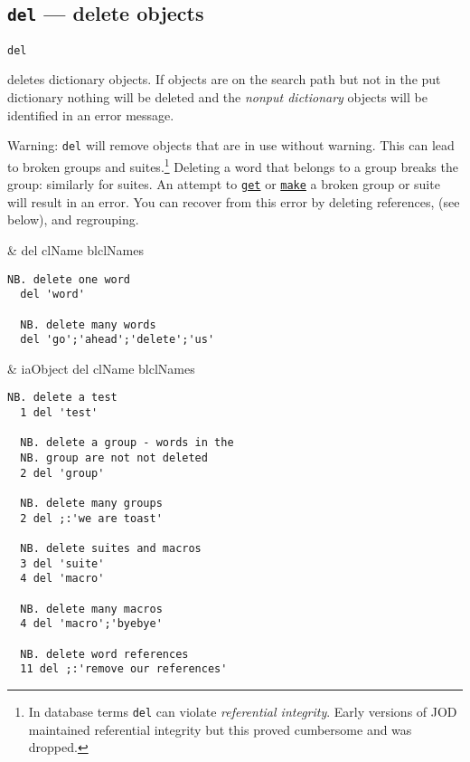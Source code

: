 \subsection{\texttt{del} --- delete objects}

\hypertarget{il:del}{\texttt{del}} deletes dictionary objects. 
If objects are on the search path but not
 in the put dictionary nothing will be deleted and 
 the \emph{nonput dictionary} objects will be identified in an error message. 

Warning: \texttt{del} will remove objects that are in use without warning.
 This can lead to broken groups and suites.\footnote{In database
 terms \texttt{del} can violate \emph{referential integrity}. Early versions
 of JOD maintained referential integrity but this proved cumbersome and
 was dropped.} Deleting a word that belongs
 to a group breaks the group:  similarly for suites.
 An attempt to \hyperlink{il:get}{\texttt{get}} or \hyperlink{il:make}{\texttt{make}}
  a broken group or suite will result in an error.  You can recover from this
  error by deleting references, (see below), and regrouping.
  
\begin{wordhead}
\monad &  del clName \argsep blclNames \\
\end{wordhead}
\begin{lstlisting}[frame=single,framerule=0pt]
  NB. delete one word
  del 'word'  
  
  NB. delete many words                   
  del 'go';'ahead';'delete';'us' 
\end{lstlisting}

\begin{wordhead}
\dyad & iaObject del clName \argsep blclNames \\
\end{wordhead}
\begin{lstlisting}[frame=single,framerule=0pt]
  NB. delete a test
  1 del 'test'  
  
  NB. delete a group - words in the
  NB. group are not not deleted 
  2 del 'group' 

  NB. delete many groups
  2 del ;:'we are toast' 
  
  NB. delete suites and macros 
  3 del 'suite'           
  4 del 'macro'
  
  NB. delete many macros
  4 del 'macro';'byebye'  
  
  NB. delete word references  
  11 del ;:'remove our references'  
\end{lstlisting}

